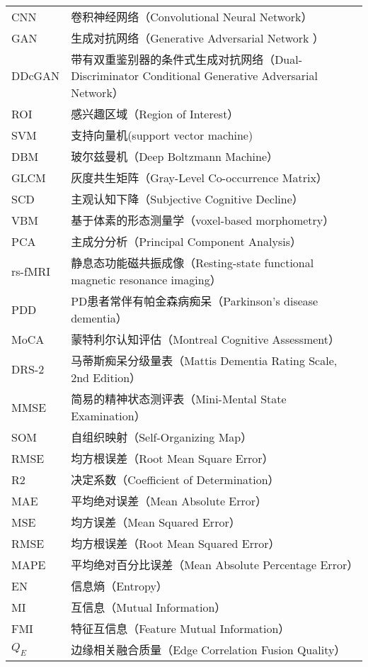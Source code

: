 \begin{longtable}{p{2.5cm}<{\centering}p{10.0cm}<{\centering}}
 CNN   &  卷积神经网络（Convolutional Neural Network）  \\
 GAN   & 生成对抗网络（Generative Adversarial Network ）   \\
DDcGAN    &带有双重鉴别器的条件式生成对抗网络（Dual-Discriminator Conditional Generative Adversarial Network）    \\
 ROI   & 感兴趣区域（Region of Interest）   \\
 SVM   &支持向量机(support vector machine)    \\
DBM    &玻尔兹曼机（Deep Boltzmann Machine）    \\
GLCM    & 灰度共生矩阵（Gray-Level Co-occurrence Matrix）   \\
SCD    & 主观认知下降（Subjective Cognitive Decline）   \\
 VBM   &基于体素的形态测量学（voxel-based morphometry）    \\
PCA    &主成分分析（Principal Component Analysis）  \\
rs-fMRI    & 静息态功能磁共振成像（Resting-state functional magnetic resonance imaging）   \\
 PDD   &PD患者常伴有帕金森病痴呆（Parkinson’s disease dementia）    \\
 MoCA   & 蒙特利尔认知评估（Montreal Cognitive Assessment）  \\
 DRS-2   & 马蒂斯痴呆分级量表（Mattis Dementia Rating Scale, 2nd Edition）   \\
 MMSE   &简易的精神状态测评表（Mini-Mental State Examination）    \\
 SOM   & 自组织映射（Self-Organizing Map）   \\
  RMSE   & 均方根误差（Root Mean Square Error）    \\
 R2    &决定系数（Coefficient of Determination）     \\
MAE     & 平均绝对误差（Mean Absolute Error）    \\
 MSE    & 均方误差（Mean Squared Error）    \\
  RMSE   & 均方根误差（Root Mean Squared Error）    \\
MAPE    &平均绝对百分比误差（Mean Absolute Percentage Error）  \\
  EN   &信息熵（Entropy）     \\
  MI   & 互信息（Mutual Information）    \\
FMI  &特征互信息（Feature Mutual Information）   \\
$Q_E$   &边缘相关融合质量（Edge Correlation Fusion Quality）  \\

\end{longtable}
